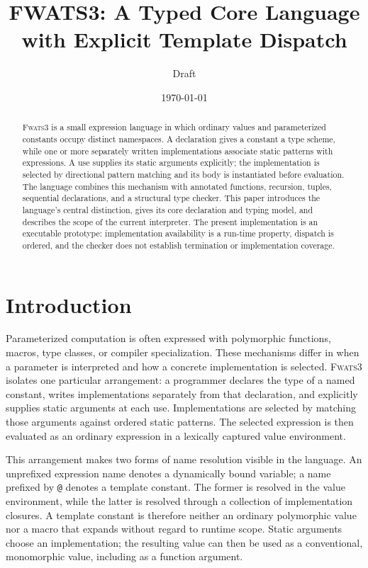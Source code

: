 \documentclass[11pt]{article}
\title{FWATS3: A Typed Core Language with Explicit Template Dispatch}
\author{Draft}
\date{\today}
\newcommand{\FWATS}{\textsc{Fwats3}}
\begin{document}
\maketitle

\begin{abstract}
\FWATS{} is a small expression language in which ordinary values and
parameterized constants occupy distinct namespaces. A declaration gives a
constant a type scheme, while one or more separately written implementations
associate static patterns with expressions. A use supplies its static
arguments explicitly; the implementation is selected by directional pattern
matching and its body is instantiated before evaluation. The language combines
this mechanism with annotated functions, recursion, tuples, sequential declarations,
and a structural type checker. This paper introduces the language's central
distinction, gives its core declaration and typing model, and describes the
scope of the current interpreter. The present implementation is an executable
prototype: implementation availability is a run-time property, dispatch is
ordered, and the checker does not establish termination or implementation
coverage.
\end{abstract}

\section{Introduction}

Parameterized computation is often expressed with polymorphic functions,
macros, type classes, or compiler specialization. These mechanisms differ in
when a parameter is interpreted and how a concrete implementation is selected.
\FWATS{} isolates one particular arrangement: a programmer declares the type
of a named constant, writes implementations separately from that declaration,
and explicitly supplies static arguments at each use. Implementations are
selected by matching those arguments against ordered static patterns. The
selected expression is then evaluated as an ordinary expression in a
lexically captured value environment.

This arrangement makes two forms of name resolution visible in the language.
An unprefixed expression name denotes a dynamically bound variable; a name
prefixed by \texttt{@} denotes a template constant. The former is resolved in
the value environment, while the latter is resolved through a collection of
implementation closures. A template constant is therefore neither an ordinary
polymorphic value nor a macro that expands without regard to runtime scope.
Static arguments choose an implementation; the resulting value can then be
used as a conventional, monomorphic value, including as a function argument.
\end{document}

